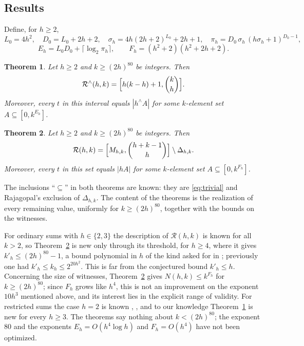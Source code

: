 \documentclass[11pt]{amsart}
\newtheorem{theorem}{Theorem}[section]
\theoremstyle{definition}
\theoremstyle{remark}
\numberwithin{equation}{section}
\newcommand{\R}{\mathcal{R}}
\newcommand{\Rr}{\mathcal{R}^{\wedge}}
\newcommand{\res}[2]{#1^{\wedge}#2}
\begin{document}
\subsection{Results}
Define, for $h\ge 2$,
\[
L_0=4h^2,\quad D_0=L_0+2h+2,\quad \sigma_h=4h(2h+2)^{L_0}+2h+1,\quad \pi_h=D_0\,\sigma_h\,(h\sigma_h+1)^{D_0-1},
\]
\[
E_h=L_0D_0+\lceil\log_2\pi_h\rceil,\qquad F_h=(h^2+2)(h^2+2h+2).
\]

\begin{theorem}\label{thm:restricted}
Let $h\ge 2$ and $k\ge(2h)^{80}$ be integers. Then
\[
\Rr(h,k)=\Bigl[h(k-h)+1,\binom kh\Bigr].
\]
Moreover, every $t$ in this interval equals $|\res hA|$ for some $k$-element set $A\subseteq[0,k^{E_h}]$.
\end{theorem}

\begin{theorem}\label{thm:ordinary}
Let $h\ge 2$ and $k\ge(2h)^{80}$ be integers. Then
\[
\R(h,k)=\Bigl[M_{h,k},\binom{h+k-1}{h}\Bigr]\setminus\Delta_{h,k}.
\]
Moreover, every $t$ in this set equals $|hA|$ for some $k$-element set $A\subseteq[0,k^{F_h}]$.
\end{theorem}

The inclusions ``$\subseteq$'' in both theorems are known: they are \eqref{eq:trivial} and Rajagopal's exclusion of $\Delta_{h,k}$. The content of the theorems is the realization of every remaining value, uniformly for $k\ge(2h)^{80}$, together with the bounds on the witnesses.

For ordinary sums with $h\in\{2,3\}$ the description of $\R(h,k)$ is known for all $k>2$, so Theorem~\ref{thm:ordinary} is new only through its threshold, for $h\ge 4$, where it gives $k'_h\le(2h)^{80}-1$, a bound polynomial in $h$ of the kind asked for in \cite[Section~5.1]{Raj26}; previously one had $k'_h\le k_h\le 2^{20h^2}$. This is far from the conjectured bound $k'_h\le h$. Concerning the size of witnesses, Theorem~\ref{thm:ordinary} gives $N(h,k)\le k^{F_h}$ for $k\ge(2h)^{80}$; since $F_h$ grows like $h^4$, this is not an improvement on the exponent $10h^3$ mentioned above, and its interest lies in the explicit range of validity. For restricted sums the case $h=2$ is known \cite[Theorem~6]{Nat25}, \cite{QC}, and to our knowledge Theorem~\ref{thm:restricted} is new for every $h\ge 3$. The theorems say nothing about $k<(2h)^{80}$; the exponent $80$ and the exponents $E_h=O(h^4\log h)$ and $F_h=O(h^4)$ have not been optimized.
\end{document}
